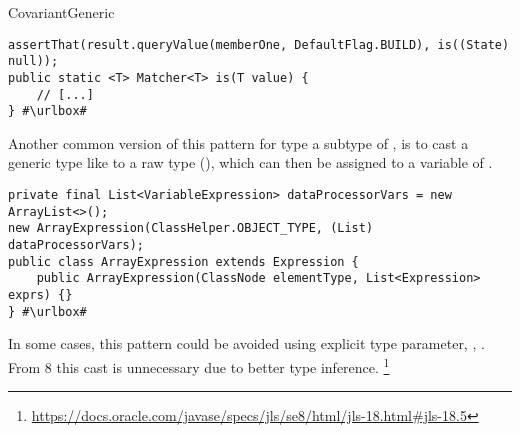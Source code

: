 \begin{pattern}{CovariantGeneric}
\def\urlvar{http://bit.ly/EngineHub_WorldGuard_2IVUOx1}
\begin{verbatim}
assertThat(result.queryValue(memberOne, DefaultFlag.BUILD), is((State) null));
public static <T> Matcher<T> is(T value) {
    // [...]
} #\urlbox#
\end{verbatim}

Another common version of this pattern for type  a subtype of ,
is to cast a generic type like  to a raw type (),
which can then be assigned to a variable of .
\def\urlvar{http://bit.ly/spockframework_spock_2UYEsF5}
\begin{verbatim}
private final List<VariableExpression> dataProcessorVars = new ArrayList<>();
new ArrayExpression(ClassHelper.OBJECT_TYPE, (List) dataProcessorVars);
public class ArrayExpression extends Expression {
    public ArrayExpression(ClassNode elementType, List<Expression> exprs) {}
} #\urlbox#
\end{verbatim}


\issues{}
In some cases, this pattern could be avoided using explicit type parameter,
\eg, .
From \java{} 8 this cast is unnecessary due to better type inference.%
\footnote{\url{https://docs.oracle.com/javase/specs/jls/se8/html/jls-18.html\#jls-18.5}}


\end{pattern}